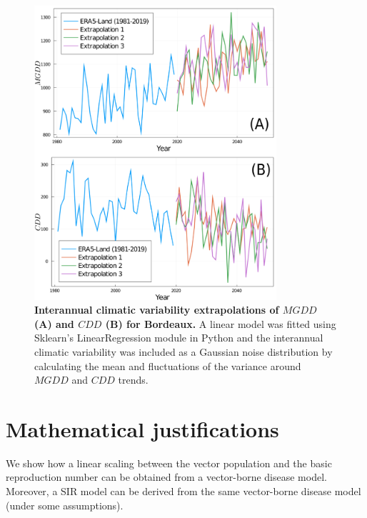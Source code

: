 \begin{figure}[H]
    \centering

    \includegraphics[width=0.8\textwidth]{Figures/MGDD_CDD_scenarios.png}
    \caption{\textbf{Interannual climatic variability extrapolations of
            $MGDD$	(A) and $CDD$ (B) for Bordeaux.} A linear model was
        fitted using
        Sklearn's LinearRegression module in Python and the interannual
        climatic
        variability was included as a Gaussian noise distribution by
        calculating the
        mean and fluctuations of the variance around $MGDD$ and $CDD$ trends.}
    \label{figS13} %
\end{figure}

\section{Mathematical justifications}\label{app:SIR_justifications}

We show how a linear scaling between the vector population and the basic
reproduction number can be obtained from a vector-borne disease model.
Moreover, a SIR model can be derived from the same vector-borne disease model
(under some assumptions).

